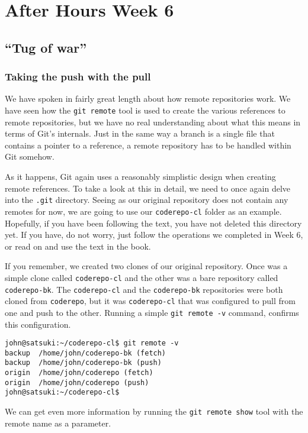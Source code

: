\chapter{After Hours Week 6}
\section{``Tug of war''}
\subsection{Taking the push with the pull}

We have spoken in fairly great length about how remote repositories work.
We have seen how the \texttt{git remote} tool is used to create the various references to remote repositories, but we have no real understanding about what this means in terms of Git's internals.
Just in the same way a branch is a single file that contains a pointer to a reference, a remote repository has to be handled within Git somehow.

As it happens, Git again uses a reasonably simplistic design when creating remote references.
To take a look at this in detail, we need to once again delve into the \texttt{.git} directory.
Seeing as our original repository does not contain any remotes for now, we are going to use our \texttt{coderepo-cl} folder as an example.
Hopefully, if you have been following the text, you have not deleted this directory yet.
If you have, do not worry, just follow the operations we completed in Week 6, or read on and use the text in the book.

If you remember, we created two clones of our original repository.
Once was a simple clone called \texttt{coderepo-cl} and the other was a bare repository called \texttt{coderepo-bk}.
The \texttt{coderepo-cl} and the \texttt{coderepo-bk} repositories were both cloned from \texttt{coderepo}, but it was \texttt{coderepo-cl} that was configured to pull from one and push to the other.
Running a simple \texttt{git remote -v} command, confirms this configuration.

\begin{Verbatim}
john@satsuki:~/coderepo-cl$ git remote -v
backup	/home/john/coderepo-bk (fetch)
backup	/home/john/coderepo-bk (push)
origin	/home/john/coderepo (fetch)
origin	/home/john/coderepo (push)
john@satsuki:~/coderepo-cl$
\end{Verbatim}

We can get even more information by running the \texttt{git remote show} tool with the remote name as a parameter.

